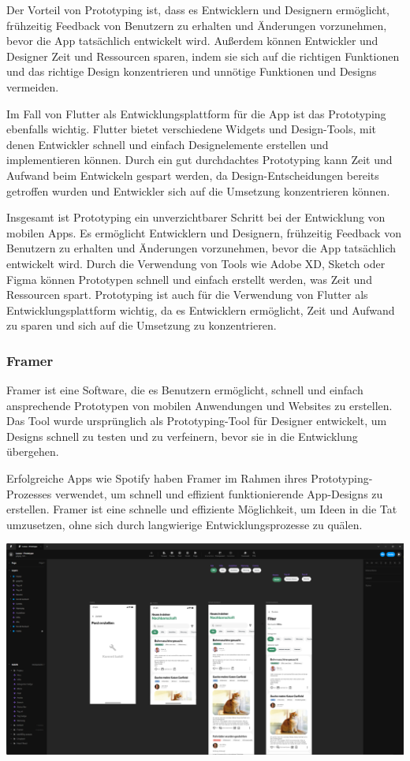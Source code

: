 Der Vorteil von Prototyping ist, dass es Entwicklern und Designern ermöglicht, frühzeitig Feedback von Benutzern zu erhalten und Änderungen vorzunehmen, bevor die App tatsächlich entwickelt wird. Außerdem können Entwickler und Designer Zeit und Ressourcen sparen, indem sie sich auf die richtigen Funktionen und das richtige Design konzentrieren und unnötige Funktionen und Designs vermeiden.

Im Fall von Flutter als Entwicklungsplattform für die App ist das Prototyping ebenfalls wichtig. Flutter bietet verschiedene Widgets und Design-Tools, mit denen Entwickler schnell und einfach Designelemente erstellen und implementieren können. Durch ein gut durchdachtes Prototyping kann Zeit und Aufwand beim Entwickeln gespart werden, da Design-Entscheidungen bereits getroffen wurden und Entwickler sich auf die Umsetzung konzentrieren können.

Insgesamt ist Prototyping ein unverzichtbarer Schritt bei der Entwicklung von mobilen Apps. Es ermöglicht Entwicklern und Designern, frühzeitig Feedback von Benutzern zu erhalten und Änderungen vorzunehmen, bevor die App tatsächlich entwickelt wird. Durch die Verwendung von Tools wie Adobe XD, Sketch oder Figma können Prototypen schnell und einfach erstellt werden, was Zeit und Ressourcen spart. Prototyping ist auch für die Verwendung von Flutter als Entwicklungsplattform wichtig, da es Entwicklern ermöglicht, Zeit und Aufwand zu sparen und sich auf die Umsetzung zu konzentrieren.
\subsubsection{Framer}

Framer ist eine Software, die es Benutzern ermöglicht, schnell und einfach ansprechende Prototypen von mobilen Anwendungen und Websites zu erstellen. Das Tool wurde ursprünglich als Prototyping-Tool für Designer entwickelt, um Designs schnell zu testen und zu verfeinern, bevor sie in die Entwicklung übergehen.

Erfolgreiche Apps wie Spotify haben Framer im Rahmen ihres
Prototyping-Prozesses verwendet, um schnell und effizient
funktionierende App-Designs zu erstellen. Framer ist eine
schnelle und effiziente Möglichkeit, um Ideen in die Tat
umzusetzen, ohne sich durch langwierige Entwicklungsprozesse
zu quälen.

\includegraphics[width=1\textwidth]{pics/nochba-framer-prototype-screenshot.png}


